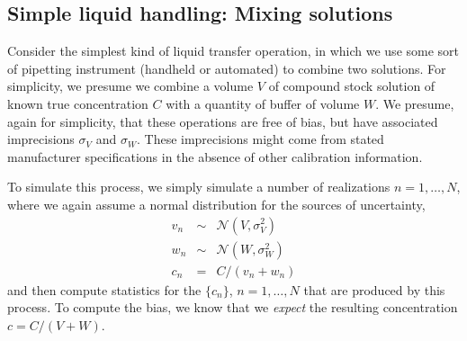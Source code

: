 \documentclass[aps,pre,twocolumn,nofootinbib,superscriptaddress,linenumbers]{revtex4-1}
\begin{document}
%

\subsection*{Simple liquid handling: Mixing solutions}

Consider the simplest kind of liquid transfer operation, in which we use some sort of pipetting instrument (handheld or automated) to combine two solutions.
For simplicity, we presume we combine a volume $V$ of compound stock solution of known true concentration $C$ with a quantity of buffer of volume $W$.
We presume, again for simplicity, that these operations are free of bias, but have associated imprecisions $\sigma_V$ and $\sigma_W$. 
These imprecisions might come from stated manufacturer specifications in the absence of other calibration information.

To simulate this process, we simply simulate a number of realizations $n = 1, \ldots, N$, where we again assume a normal distribution for the sources of uncertainty,
\begin{eqnarray}
v_n &\sim& \mathcal{N}(V, \sigma_V^2) \nonumber \\
w_n &\sim& \mathcal{N}(W, \sigma_W^2) \nonumber \\
c_n &=& C / (v_n + w_n)
\end{eqnarray}
and then compute statistics for the $\{c_n\}$, $n = 1,\ldots,N$ that are produced by this process.
To compute the bias, we know that we \emph{expect} the resulting concentration $c = C/ (V + W)$.
\end{document}

